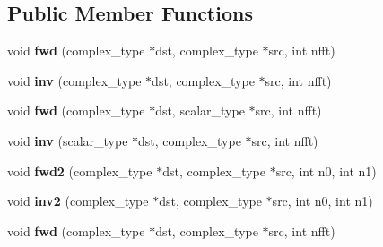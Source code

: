 \subsection*{Public Member Functions}
\begin{DoxyCompactItemize}
\item 
\mbox{\label{struct_eigen_1_1internal_1_1fftw__plan_3_01float_01_4_a5b61a0f3bb0e5eace0598398b8cba6d0}} 
void {\bfseries fwd} (complex\+\_\+type $\ast$dst, complex\+\_\+type $\ast$src, int nfft)
\item 
\mbox{\label{struct_eigen_1_1internal_1_1fftw__plan_3_01float_01_4_a78a8f341140274c6f774249a036cb0ec}} 
void {\bfseries inv} (complex\+\_\+type $\ast$dst, complex\+\_\+type $\ast$src, int nfft)
\item 
\mbox{\label{struct_eigen_1_1internal_1_1fftw__plan_3_01float_01_4_ac396c8a47534e2445f49dbedd6a9a215}} 
void {\bfseries fwd} (complex\+\_\+type $\ast$dst, scalar\+\_\+type $\ast$src, int nfft)
\item 
\mbox{\label{struct_eigen_1_1internal_1_1fftw__plan_3_01float_01_4_aed2d74d018c7b8855ce15610352876ff}} 
void {\bfseries inv} (scalar\+\_\+type $\ast$dst, complex\+\_\+type $\ast$src, int nfft)
\item 
\mbox{\label{struct_eigen_1_1internal_1_1fftw__plan_3_01float_01_4_a7e1dc8f284956388a99057679279d239}} 
void {\bfseries fwd2} (complex\+\_\+type $\ast$dst, complex\+\_\+type $\ast$src, int n0, int n1)
\item 
\mbox{\label{struct_eigen_1_1internal_1_1fftw__plan_3_01float_01_4_a73bdf2658c77f24e75b244d4b2c9c2a4}} 
void {\bfseries inv2} (complex\+\_\+type $\ast$dst, complex\+\_\+type $\ast$src, int n0, int n1)
\item 
\mbox{\label{struct_eigen_1_1internal_1_1fftw__plan_3_01float_01_4_a5b61a0f3bb0e5eace0598398b8cba6d0}} 
void {\bfseries fwd} (complex\+\_\+type $\ast$dst, complex\+\_\+type $\ast$src, int nfft)

\end{DoxyCompactItemize}
